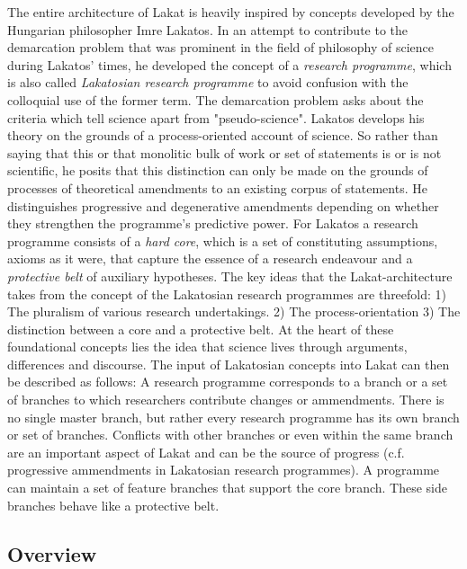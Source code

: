 The entire architecture of Lakat is heavily inspired by concepts developed by the Hungarian philosopher Imre Lakatos. In an attempt to contribute to the demarcation problem\cite{} that was prominent in the field of philosophy of science during Lakatos' times, he developed the concept of a \textit{research programme}\cite{}, which is also called \textit{Lakatosian research programme} to avoid confusion with the colloquial use of the former term. The demarcation problem asks about the criteria which tell science apart from "pseudo-science".  Lakatos develops his theory on the grounds of a process-oriented account of science. So rather than saying that this or that monolitic bulk of work or set of statements is or is not scientific, he posits that this distinction can only be made on the grounds of processes of theoretical amendments to an existing corpus of statements. He distinguishes progressive and degenerative amendments depending on whether they strengthen the programme's predictive power. For Lakatos a research programme consists of a \textit{hard core}, which is a set of constituting assumptions, axioms as it were, that capture the essence of a research endeavour and a \textit{protective belt} of auxiliary hypotheses. The key ideas that the Lakat-architecture takes from the concept of the Lakatosian research programmes are threefold: 1) The pluralism of various research undertakings. 2) The process-orientation 3) The distinction between a core and a protective belt. At the heart of these foundational concepts lies the idea that science lives through arguments, differences and discourse. The input of Lakatosian concepts into Lakat can then be described as follows: A research programme corresponds to a branch or a set of branches to which researchers contribute changes or ammendments. There is no single master branch, but rather every research programme has its own branch or set of branches. Conflicts with other branches or even within the same branch are an important aspect of Lakat and can be the source of progress (c.f. progressive ammendments in Lakatosian research programmes). A programme can maintain a set of feature branches that support the core branch. These side branches behave like a protective belt.  
% 

\subsection{Overview}

